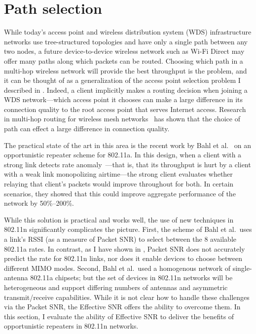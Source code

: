 \section{Path selection}\label{sec:esnr_pathsel}
While today's access point and wireless distribution system (WDS) infrastructure networks use tree-structured topologies and have only a single path between any two nodes, a future device-to-device wireless network such as Wi-Fi Direct may offer many paths along which packets can be routed. Choosing which path in a multi-hop wireless network will provide the best throughput is the  problem, and it can be thought of as a generalization of the access point selection problem I described in . Indeed, a client implicitly makes a routing decision when joining a WDS network---which access point it chooses can make a large difference in its connection quality to the root access point that serves Internet access. Research in multi-hop routing for wireless mesh networks~\cite{Bahl_repeater,Rodrig_thesis} has shown that the choice of path can effect a large difference in connection quality.

The practical state of the art in this area is the recent work by Bahl et al.~\cite{Bahl_repeater} on an opportunistic repeater scheme for 802.11a. In this design, when a client with a strong link detects rate anomaly~\cite{Heusse_RateAnomaly}---that is, that its throughput is hurt by a client with a weak link monopolizing airtime---the strong client evaluates whether relaying that client's packets would improve throughout for both. In certain scenarios, they showed that this could improve aggregate performance of the network by 50\%--200\%.

While this solution is practical and works well, the use of new techniques in 802.11n significantly complicates the picture. First, the scheme of Bahl et al.\ uses a link's RSSI (as a measure of Packet SNR) to select between the 8 available 802.11a rates. In contrast, as I have shown in , Packet SNR does not accurately predict the rate for 802.11n links, nor does it enable devices to choose between different MIMO modes. Second, Bahl et al.\ used a homogenous network of single-antenna 802.11a chipsets; but the set of devices in 802.11n networks will be heterogeneous and support differing numbers of antennas and asymmetric transmit/receive capabilities. While it is not clear how to handle these challenges via the Packet SNR, the Effective SNR offers the ability to overcome them. In this section, I evaluate the ability of Effective SNR to deliver the benefits of opportunistic repeaters in 802.11n networks.

